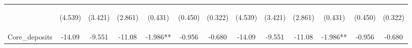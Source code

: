 \documentclass[]{article}
\begin{document}
\begin{center}
\begin{tabular}{lcccccccccccc}
\vspace{4pt} & \begin{footnotesize}(4.539)\end{footnotesize} & \begin{footnotesize}(3.421)\end{footnotesize} & \begin{footnotesize}(2.861)\end{footnotesize} & \begin{footnotesize}(0.431)\end{footnotesize} & \begin{footnotesize}(0.450)\end{footnotesize} & \begin{footnotesize}(0.322)\end{footnotesize} & \begin{footnotesize}(4.539)\end{footnotesize} & \begin{footnotesize}(3.421)\end{footnotesize} & \begin{footnotesize}(2.861)\end{footnotesize} & \begin{footnotesize}(0.431)\end{footnotesize} & \begin{footnotesize}(0.450)\end{footnotesize} & \begin{footnotesize}(0.322)\end{footnotesize} \\
Core\_deposits & -14.09 & -9.551 & -11.08 & -1.986** & -0.956 & -0.680 & -14.09 & -9.551 & -11.08 & -1.986** & -0.956 & -0.680 \\

\end{tabular}
\end{center}
\end{document}
